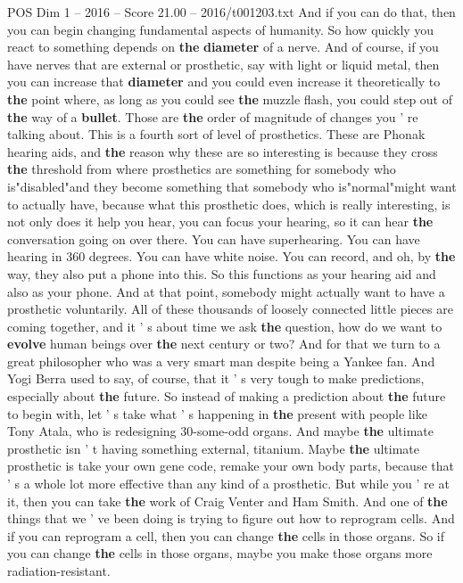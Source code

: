 \begin{textsample}{POS Dim 1 – 2016 – Score 21.00 – 2016/t001203.txt}
And if you can do that, then you can begin changing fundamental aspects of humanity.
So how quickly you react to something depends on \textbf{the} \textbf{diameter} of a nerve.
And of course, if you have nerves that are external or prosthetic, say with light or liquid metal, then you can increase that \textbf{diameter} and you could even increase it theoretically to \textbf{the} point where, as long as you could see \textbf{the} muzzle flash, you could step out of \textbf{the} way of a \textbf{bullet}.
Those are \textbf{the} order of magnitude of changes you ' re talking about.
This is a fourth sort of level of prosthetics.
These are Phonak hearing aids, and \textbf{the} reason why these are so interesting is because they cross \textbf{the} threshold from where prosthetics are something for somebody who is"disabled"and they become something that somebody who is"normal"might want to actually have, because what this prosthetic does, which is really interesting, is not only does it help you hear, you can focus your hearing, so it can hear \textbf{the} conversation going on over there.
You can have superhearing.
You can have hearing in 360 degrees.
You can have white noise.
You can record, and oh, by \textbf{the} way, they also put a phone into this.
So this functions as your hearing aid and also as your phone.
And at that point, somebody might actually want to have a prosthetic voluntarily.
All of these thousands of loosely connected little pieces are coming together, and it ' s about time we ask \textbf{the} question, how do we want to \textbf{evolve} human beings over \textbf{the} next century or two?
And for that we turn to a great philosopher who was a very smart man despite being a Yankee fan.
And Yogi Berra used to say, of course, that it ' s very tough to make predictions, especially about \textbf{the} future.
So instead of making a prediction about \textbf{the} future to begin with, let ' s take what ' s happening in \textbf{the} present with people like Tony Atala, who is redesigning 30-some-odd organs.
And maybe \textbf{the} ultimate prosthetic isn ' t having something external, titanium.
Maybe \textbf{the} ultimate prosthetic is take your own gene code, remake your own body parts, because that ' s a whole lot more effective than any kind of a prosthetic.
But while you ' re at it, then you can take \textbf{the} work of Craig Venter and Ham Smith.
And one of \textbf{the} things that we ' ve been doing is trying to figure out how to reprogram cells.
And if you can reprogram a cell, then you can change \textbf{the} cells in those organs.
So if you can change \textbf{the} cells in those organs, maybe you make those organs more radiation-resistant.

\end{textsample}
